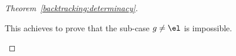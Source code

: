 \begin{proof}[Theorem~\ref{backtracking:determinacy}]
\begin{enumerate}
\begin{enumerate}
\begin{enumerate}
         \end{enumerate}
         This achieves to prove that the sub\hyp{}case \(g \neq \el\)
         is impossible.

    \end{enumerate}

\end{enumerate}
\end{proof}
